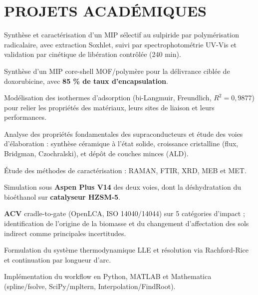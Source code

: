 \documentclass[10pt]{article}
\begin{document}
\section{PROJETS ACADÉMIQUES}
\begin{bul}
\item Synthèse et caractérisation d'un MIP sélectif au sulpiride par polymérisation radicalaire, avec extraction Soxhlet, suivi par spectrophotométrie UV-Vis et validation par cinétique de libération contrôlée (240 min).
\item Synthèse d'un MIP core-shell MOF/polymère pour la délivrance ciblée de doxorubicine, avec \textbf{85 \% de taux d'encapsulation}.
\item Modélisation des isothermes d'adsorption (bi-Langmuir, Freundlich, $R^2 = 0{,}9877$) pour relier les propriétés des matériaux, leurs sites de liaison et leurs performances.
\end{bul}
\begin{bul}
\item Analyse des propriétés fondamentales des supraconducteurs et étude des voies d'élaboration : synthèse céramique à l'état solide, croissance cristalline (flux, Bridgman, Czochralski), et dépôt de couches minces (ALD).
\item Étude des méthodes de caractérisation : RAMAN, FTIR, XRD, MEB et MET.
\end{bul}
\begin{bul}
\item Simulation sous \textbf{Aspen Plus V14} des deux voies, dont la déshydratation du bioéthanol sur \textbf{catalyseur HZSM-5}.
\item \textbf{ACV} cradle-to-gate (OpenLCA, ISO 14040/14044) sur 5 catégories d'impact ; identification de l'origine de la biomasse et du changement d'affectation des sols indirect comme principales incertitudes.
\end{bul}
\begin{bul}
\item Formulation du système thermodynamique LLE et résolution via Rachford-Rice et continuation par longueur d'arc.
\item Implémentation du workflow en Python, MATLAB et Mathematica (spline/fsolve, SciPy/mpltern, Interpolation/FindRoot).
\end{bul}
\end{document}
